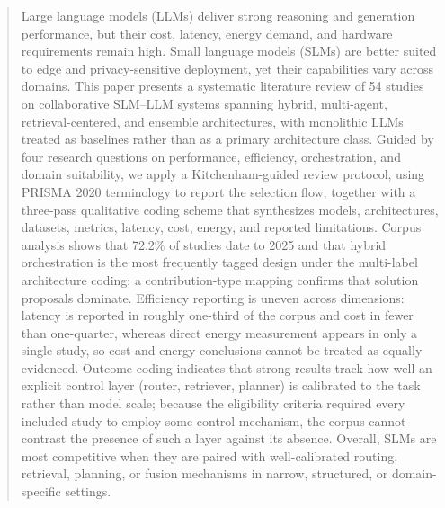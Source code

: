\begin{abstract}
Large language models (LLMs) deliver strong reasoning and generation performance, but their cost, latency, energy demand, and hardware requirements remain high. Small language models (SLMs) are better suited to edge and privacy-sensitive deployment, yet their capabilities vary across domains. This paper presents a systematic literature review of 54 studies on collaborative SLM--LLM systems spanning hybrid, multi-agent, retrieval-centered, and ensemble architectures, with monolithic LLMs treated as baselines rather than as a primary architecture class. Guided by four research questions on performance, efficiency, orchestration, and domain suitability, we apply a Kitchenham-guided review protocol, using PRISMA 2020 terminology to report the selection flow, together with a three-pass qualitative coding scheme that synthesizes models, architectures, datasets, metrics, latency, cost, energy, and reported limitations. Corpus analysis shows that 72.2\% of studies date to 2025 and that hybrid orchestration is the most frequently tagged design under the multi-label architecture coding; a contribution-type mapping confirms that solution proposals dominate. Efficiency reporting is uneven across dimensions: latency is reported in roughly one-third of the corpus and cost in fewer than one-quarter, whereas direct energy measurement appears in only a single study, so cost and energy conclusions cannot be treated as equally evidenced. Outcome coding indicates that strong results track how well an explicit control layer (router, retriever, planner) is calibrated to the task rather than model scale; because the eligibility criteria required every included study to employ some control mechanism, the corpus cannot contrast the presence of such a layer against its absence. Overall, SLMs are most competitive when they are paired with well-calibrated routing, retrieval, planning, or fusion mechanisms in narrow, structured, or domain-specific settings.
\end{abstract}
